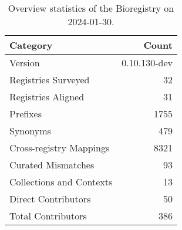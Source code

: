\begin{table}
\caption{Overview statistics of the Bioregistry on 2024-01-30.}
\label{tab:bioregistry-summary}
\begin{tabular}{lr}
\toprule
Category & Count \\
\midrule
Version & 0.10.130-dev \\
Registries Surveyed & 32 \\
Registries Aligned & 31 \\
Prefixes & 1755 \\
Synonyms & 479 \\
Cross-registry Mappings & 8321 \\
Curated Mismatches & 93 \\
Collections and Contexts & 13 \\
Direct Contributors & 50 \\
Total Contributors & 386 \\
\bottomrule
\end{tabular}
\end{table}

